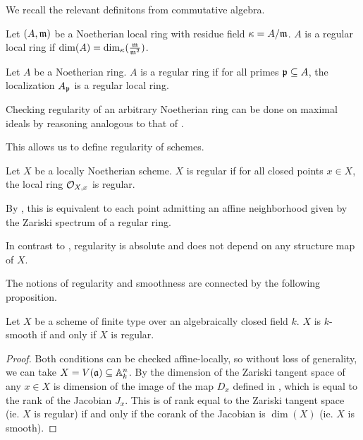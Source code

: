 We recall the relevant definitons from commutative algebra. 
\begin{definition}\label{def: regular local ring}
    Let $(A,\mathfrak{m})$ be a Noetherian local ring with residue field $\kappa=A/\mathfrak{m}$. $A$ is a regular local ring if $\dim(A)=\dim_{\kappa}(\frac{\mathfrak{m}}{\mathfrak{m}^{2}})$. 
\end{definition}
\begin{definition}\label{def: regular ring}
    Let $A$ be a Noetherian ring. $A$ is a regular ring if for all primes $\mathfrak{p}\subseteq A$, the localization $A_{\mathfrak{p}}$ is a regular local ring. 
\end{definition}
\begin{remark}
    Checking regularity of an arbitrary Noetherian ring can be done on maximal ideals by reasoning analogous to that of . 
\end{remark}
This allows us to define regularity of schemes. 
\begin{definition}\label{def: regular scheme}
    Let $X$ be a locally Noetherian scheme. $X$ is regular if for all closed points $x\in X$, the local ring $\mathcal{O}_{X,x}$ is regular. 
\end{definition}
\begin{remark}
    By , this is equivalent to each point admitting an affine neighborhood given by the Zariski spectrum of a regular ring. 
\end{remark}
\begin{remark}
    In contrast to , regularity is absolute and does not depend on any structure map of $X$. 
\end{remark}
The notions of regularity and smoothness are connected by the following proposition. 
\begin{proposition}\label{prop: smooth iff regular alg closed}
    Let $X$ be a scheme of finite type over an algebraically closed field $k$. $X$ is $k$-smooth if and only if $X$ is regular. 
\end{proposition}
\begin{proof}
    Both conditions can be checked affine-locally, so without loss of generality, we can take $X=V(\mathfrak{a})\subseteq\mathbb{A}^{n}_{k}$. By  the dimension of the Zariski tangent space of any $x\in X$ is dimension of the image of the map $D_{x}$ defined in , which is equal to the rank of the Jacobian $J_{x}$. This is of rank equal to the Zariski tangent space (ie. $X$ is regular) if and only if the corank of the Jacobian is $\dim(X)$ (ie. $X$ is smooth). 
\end{proof}
